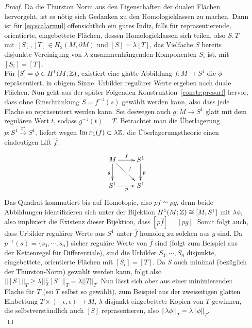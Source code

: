 \begin{proof}
            Da die Thurston Norm aus den Eigenschaften der dualen Flächen hervorgeht, ist es nötig sich Gedanken zu den Homologieklassen zu machen. Dann ist für \ref{eq:scalarmul} offensichtlich ein gutes Indiz, falls für repräsentierende, orientierte, eingebettete Flächen, dessen Homologieklassen sich teilen, also $S,T$ mit $[S],[T]\in H_2(M,\partial M)$ und $[S]=\lambda [T]$, das Vielfache $S$ bereits disjunkte Vereinigung von $\lambda$ zusammenhängenden Komponenten $S_i$ ist, mit $[S_i]=[T]$. \\
            Für $[S]=\phi \in H^1(M;\mathbb{Z})$, existiert eine glatte Abbildung $f:M \to S^1$ die $\phi$ repräsentiert, in obigem Sinne. Urbilder regulärer Werte ergeben nach  duale Flächen. Nun geht aus der später Folgenden Konstruktion~\ref{constr:presurf} hervor, dass ohne Einschränkung $S=f^{-1}(s)$ gewählt werden kann, also dass jede Fläche so repräsentiert werden kann. Sei deswegen auch $g:M \to S^1$ glatt mit dem regulären Wert $t$, sodass $g^{-1}(t)=T$. Betrachtet man die Überlagerung $p: S^1 \stackrel {z^\lambda} \to  S^1$, liefert wegen $\operatorname{Im}\pi_1(f) \subset \lambda \mathbb{Z}$, die Überlagerungstheorie einen eindeutigen Lift $\hat f$:
            \[
                \begin{xy}
                    \xymatrix{M \ar[r]^{\hat f} \ar[d]_g \ar[dr]^f&S^1 \ar[d]^p \\
                             S^1 \ar[r]_p & S^1}
                \end{xy}
            \]
            Das Quadrat kommutiert bis auf Homotopie, also $p\hat f \simeq p g$, denn beide Abbildungen identifizieren sich unter der Bijektion $H^1(M;\mathbb{Z}) \cong [M,S^1]$ mit $\lambda \phi$, also impliziert die Existenz dieser Bijektion, dass $[p\hat f] = [pg]$. Somit folgt auch, dass Urbilder regulärer Werte aus $S^1$ unter $\hat f$ homolog zu solchen aus $g$ sind. Da $p^{-1}(s)=\{s_1,\cdots,s_n\}$ sicher reguläre Werte von $\hat f$ sind (folgt zum Beispiel aus der Kettenregel für Differentiale), sind die Urbilder $S_1,\cdots,S_n$ disjunkte, eingebettete, orientierte Flächen mit $[S_i]=[T]$. Da $S$ auch minimal (bezüglich der Thurston-Norm) gewählt werden kann, folgt also $||[S]||_T \geq \lambda ||\frac 1\lambda [S]||_T = \lambda ||T||_T$. Nun lässt sich aber aus einer minimierenden Fläche für $T$ (sei $T$ selbst so gewählt), zum Beispiel aus der zweiseitigen glatten Einbettung $T \times (-\epsilon,\epsilon) \to M$, $\lambda$ disjunkt eingebettete Kopien von $T$ gewinnen, die selbstverständlich auch $[S]$ repräsentieren, also $||\lambda \phi||_T = \lambda ||\phi||_T$.\\


\end{proof}
